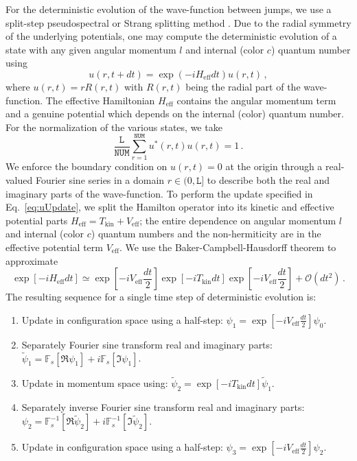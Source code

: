 \documentclass[times,sort&compress,final]{elsarticle}
\begin{document}
For the deterministic evolution of the wave-function between jumps, we use a 
split-step pseudospectral or Strang splitting method \cite{Fornberg:1978,TAHA1984203,Boyd:2019arx}. 
Due to the radial symmetry of the underlying potentials, one may compute 
the deterministic evolution of a state with any given angular momentum $l$ and 
internal (color $c$) quantum number using 
\begin{equation}
u(r,t + dt) = \exp(- i H_{\text{eff}} dt) u(r,t) \, ,
\label{eq:uUpdate}
\end{equation}
where $u(r,t) = rR(r,t)$ with $R(r,t)$ being the radial part of the wave-function.  
The effective Hamiltonian $H_\text{eff}$ contains the angular momentum term and a 
genuine potential which depends on the internal (color) quantum number.  
For the normalization of the various states, we take
\begin{equation}
\frac{\texttt{L}}{\texttt{NUM}}\sum_{r=1}^{\texttt{NUM}} u^*(r,t) u(r,t) = 1 \, .
\label{eq:normcond}
\end{equation}
We enforce the boundary condition on $u(r,t)=0$ at the origin through a real-valued 
Fourier sine series in a domain $r \in (0,{\texttt{L}}]$ to describe both the real 
and imaginary parts of the wave-function. 
To perform the update specified in Eq.~\eqref{eq:uUpdate}, we split the Hamilton operator 
into its kinetic and effective potential parts $H_\text{eff} = T_\text{kin} +  V_\text{eff}$; 
the entire dependence on angular momentum $l$ and internal (color $c$) quantum numbers and the non-hermiticity are in the effective potential term $V_\text{eff}$.
We use the Baker-Campbell-Hausdorff theorem to approximate
\begin{equation}
\exp\left[- i H_\text{eff} dt\right] \simeq \exp\left[- i V_\text{eff} \frac{dt}{2} \right] \exp\left[- i T_\text{kin} dt\right]  \exp\left[- i V_\text{eff} \frac{dt}{2} \right] + \mathcal{O}(dt^2) \, .
\end{equation}
The resulting sequence for a single time step of deterministic evolution is: 
\begin{enumerate}
	\item Update in configuration space using a half-step: $ \psi_1 = \exp\left[- i V_\text{eff} \frac{dt}{2} \right] \psi_0$.
	\item Separately Fourier sine transform real and imaginary parts: $\tilde\psi_1 = \mathbb{F}_s[\Re \psi_1] + i \mathbb{F}_s[\Im \psi_1] $.
	\item Update in momentum space using: $\tilde\psi_2 =  \exp\left[- i T_\text{kin} dt\right] \tilde\psi_1$.
	\item Separately inverse Fourier sine transform real and imaginary parts: $\psi_2 = \mathbb{F}_s^{-1}[\Re \tilde\psi_2] + i \mathbb{F}_s^{-1}[\Im \tilde\psi_2] $.
	\item Update in configuration space using a half-step: $ \psi_3 = \exp\left[- i V_\text{eff} \frac{dt}{2} \right] \psi_2$.
\end{enumerate}
\end{document}
